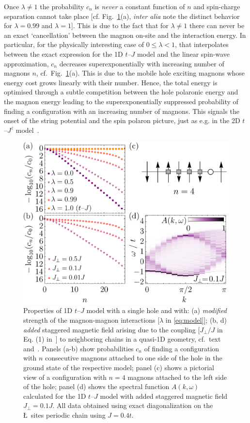 \documentclass[%
 reprint,
 amsmath,amssymb,
 aps,
prl,
]{revtex4-1}
\begin{document}
Once $ \lambda \neq 1$ the probability $c_n$  is {\it never} a constant function of $n$ and spin-charge separation cannot take place [cf. Fig.~\ref{fig:cn}(a), {\it inter alia} note the distinct behavior for $\lambda =0.99$ and $\lambda =1 $]. This is due to the fact that for $\lambda \neq 1$ there can never be an exact `cancellation' between the magnon on-site and the interaction energy. In particular, for the physically interesting case of $0 \le \lambda <1$, that interpolates between the exact expression for the 1D $t$--$J$ model and the linear spin-wave approximation, $c_n$ decreases  superexponentially with increasing number of magnons $n$, cf.~Fig.~\ref{fig:cn}(a). This is due to the mobile hole exciting magnons whose energy cost grows linearly with their number. Hence, the total energy is optimised through a subtle competition between the hole polaronic energy and the magnon energy leading to the superexponentially suppressed probability of finding a configuration with an increasing number of magnons. This signals the onset of the string potential and the spin polaron picture,
just as e.g. in the 2D $t$--$J^z$ model~\cite{Bie19}.
  
\begin{figure}[t!]
    \includegraphics[width=\columnwidth]
    {fig_4.png}
\caption{
Properties of 1D $t$--$J$ model with a single hole and with: (a) {\it modified} strength of the magnon-magnon interactions [$\lambda$ in \eqref{eq:model}];
(b, d) {\it added} staggered magnetic field arising due to the coupling [$J_\perp / J$ 
in Eq. (1) in~\cite{SM}] to neighboring chains in a quasi-1D geometry, cf.~text and~\cite{SM}.
Panels (a-b) show probabilities $c_n$ of finding a configuration with $n$ consecutive magnons attached to one side of the hole in the ground state of the 
respective model; panel (c) shows a pictorial view of a configuration with $n=4$ magnons 
attached to the left side of the hole; panel (d) shows the spectral function $A(k,\omega)$ calculated for the 
1D $t$--$J$ model with added staggered magnetic field $J_\perp = 0.1J$.
All data obtained using exact diagonalization on the \L~sites periodic chain using $J=0.4t$.
}
\label{fig:cn}
\end{figure}
\end{document}
